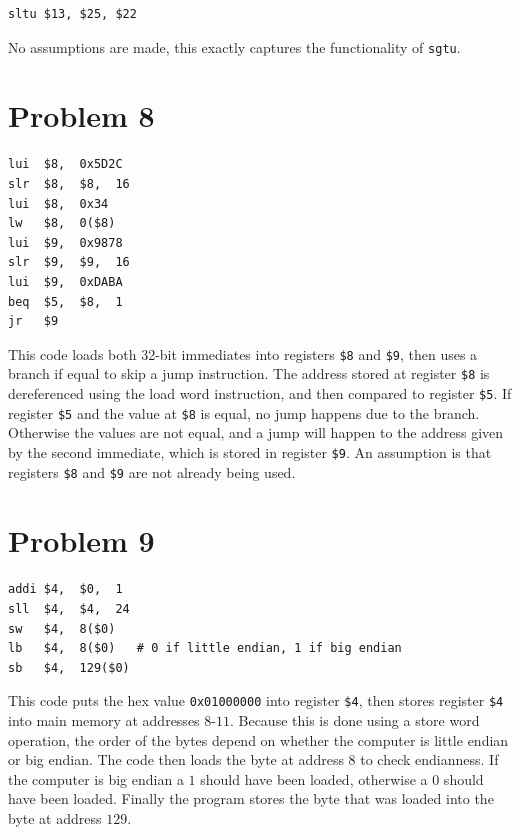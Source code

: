\documentclass[12pt]{article}
\begin{document}
\begin{verbatim}
sltu $13, $25, $22
\end{verbatim}
No assumptions are made, this exactly captures the functionality of \texttt{sgtu}.

\section*{Problem 8}

\begin{verbatim}
lui  $8,  0x5D2C
slr  $8,  $8,  16
lui  $8,  0x34
lw   $8,  0($8)
lui  $9,  0x9878
slr  $9,  $9,  16
lui  $9,  0xDABA
beq  $5,  $8,  1
jr   $9
\end{verbatim}
This code loads both 32-bit immediates into registers \texttt{\$8} and \texttt{\$9}, then uses a branch if equal to skip a jump instruction.
The address stored at register \texttt{\$8} is dereferenced using the load word instruction, and then compared to register \texttt{\$5}.
If register \texttt{\$5} and the value at \texttt{\$8} is equal, no jump happens due to the branch. Otherwise the values are not equal, and
a jump will happen to the address given by the second immediate, which is stored in register \texttt{\$9}. An assumption is that registers
\texttt{\$8} and \texttt{\$9} are not already being used.

\section*{Problem 9}

\begin{verbatim}
addi $4,  $0,  1
sll  $4,  $4,  24
sw   $4,  8($0)
lb   $4,  8($0)   # 0 if little endian, 1 if big endian
sb   $4,  129($0)
\end{verbatim}
This code puts the hex value \texttt{0x01000000} into register \texttt{\$4}, then stores register \texttt{\$4} into main memory at addresses
\(8\)-\(11\). Because this is done using a store word operation, the order of the bytes depend on whether the computer is little endian or big endian.
The code then loads the byte at address \(8\) to check endianness. If the computer is big endian a \(1\) should have been loaded, otherwise a
\(0\) should have been loaded. Finally the program stores the byte that was loaded into the byte at address \(129\).
\end{document}
